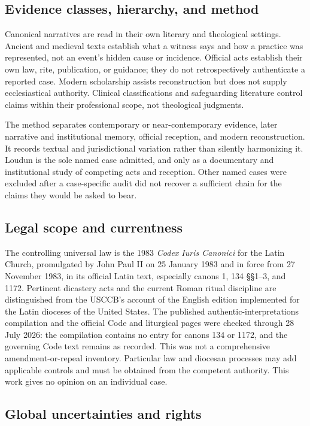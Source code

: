\subsection{Evidence classes, hierarchy, and method}

Canonical narratives are read in their own literary and theological settings.
Ancient and medieval texts establish what a witness says and how a practice was
represented, not an event's hidden cause or incidence. Official acts establish
their own law, rite, publication, or guidance; they do not retrospectively
authenticate a reported case. Modern scholarship assists reconstruction but
does not supply ecclesiastical authority. Clinical classifications and
safeguarding literature control claims within their professional scope, not
theological judgments.

The method separates contemporary or near-contemporary evidence, later
narrative and institutional memory, official reception, and modern
reconstruction. It records textual and jurisdictional variation rather than
silently harmonizing it. Loudun is the sole named case admitted, and only as a
documentary and institutional study of competing acts and reception. Other
named cases were excluded after a case-specific audit did not recover a
sufficient chain for the claims they would be asked to bear.

\subsection{Legal scope and currentness}

The controlling universal law is the 1983 \emph{Codex Iuris Canonici} for the
Latin Church, promulgated by John Paul II on 25 January 1983 and in force from
27 November 1983, in its official Latin text, especially canons 1, 134
\S\S1--3, and 1172.
Pertinent dicastery acts and the current Roman ritual
discipline are distinguished from the USCCB's account of the English edition
implemented for the Latin dioceses of the United States. The published
authentic-interpretations compilation and the official Code and liturgical
pages were checked through 28 July 2026: the compilation contains no entry for
canons 134 or 1172, and the governing Code text remains as recorded. This was
not a comprehensive
amendment-or-repeal inventory. Particular law and diocesan
processes may add applicable controls and must be obtained from the competent
authority. This work gives no opinion on an individual case.

\subsection{Global uncertainties and rights}

